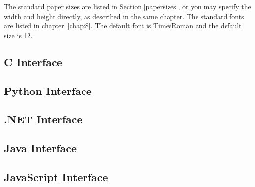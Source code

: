 \documentclass{book}
\begin{document}
\noindent The standard paper sizes are listed in Section \ref{papersizes}, or you may specify the width and height directly, as described in the same chapter. The standard fonts are listed in chapter~\ref{chap:8}. The default font is TimesRoman and the default size is 12.

\begin{cpdflib}
\clearpage
\section*{C Interface}
\begin{small}\tt

\end{small}
\end{cpdflib}

\begin{pycpdflib}
\clearpage
\section*{Python Interface}
\begin{small}\tt

\end{small}
\end{pycpdflib}

\begin{dotnetcpdflib}
\clearpage
\section*{.NET Interface}
\begin{small}\tt

\end{small}
\end{dotnetcpdflib}

\begin{jcpdflib}
\clearpage
\section*{Java Interface}
\begin{small}\tt

\end{small}
\end{jcpdflib}

\begin{jscpdflib}
\clearpage
\section*{JavaScript Interface}
\begin{small}\tt

\end{small}
\end{jscpdflib}
\end{document}
